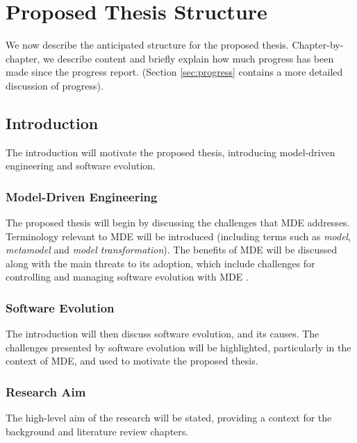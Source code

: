 

\section{Proposed Thesis Structure}
We now describe the anticipated structure for the proposed thesis. Chapter-by-chapter, we describe content and briefly explain how much progress has been made since the progress report. (Section \ref{sec:progress} contains a more detailed discussion of progress).


\subsection{Introduction}
The introduction will motivate the proposed thesis, introducing model-driven engineering and software evolution.

\subsubsection{Model-Driven Engineering}
The proposed thesis will begin by discussing the challenges that MDE addresses. Terminology relevant to MDE will be introduced (including terms such as \emph{model}, \emph{metamodel} and \emph{model transformation}). The benefits of MDE will be discussed along with the main threats to its adoption, which include challenges for controlling and managing software evolution with MDE \cite{mens07softwareevolution}.

\subsubsection{Software Evolution}
The introduction will then discuss software evolution, and its causes. The challenges presented by software evolution will be highlighted, particularly in the context of MDE, and used to motivate the proposed thesis.

\subsubsection{Research Aim}
The high-level aim of the research will be stated, providing a context for the background and literature review chapters. 

